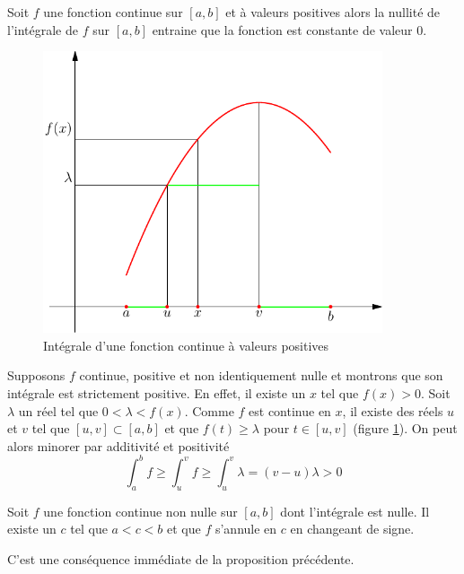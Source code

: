 \begin{propn}
 Soit $f$ une fonction continue sur $[a,b]$ et à valeurs positives alors la nullité de l'intégrale de $f$ sur $[a,b]$ entraine que la fonction est constante de valeur $0$.
\end{propn}
\begin{figure}[h!t]
 \centering
 \includegraphics[width=10cm]{C2189_4.pdf}
 \caption{Intégrale d'une fonction continue à valeurs positives}
 \label{fig:C2189_4}
\end{figure}

\begin{demo}
 Supposons $f$ continue, positive et non identiquement nulle et montrons que son intégrale est strictement positive.\newline
En effet, il existe un $x$ tel que $f(x)>0$. Soit $\lambda$ un réel tel que $0<\lambda<f(x)$. Comme $f$ est continue en $x$, il existe des réels $u$ et $v$ tel que $[u,v]\subset[a,b]$ et que $f(t)\geq \lambda$ pour $t\in [u,v]$ (figure \ref{fig:C2189_4}). On peut alors minorer par additivité et positivité
\begin{displaymath}
 \int_{a}^bf \geq \int_u^vf\geq \int_u^v\lambda = (v-u)\lambda >0
\end{displaymath}
\end{demo}
\begin{propn}
 Soit $f$ une fonction continue non nulle sur $[a,b]$ dont l'intégrale est nulle. Il existe un $c$ tel que $a<c<b$ et que $f$ s'annule en $c$ en changeant de signe.
\end{propn}
\begin{demo}
 C'est une conséquence immédiate de la proposition précédente.
\end{demo}

